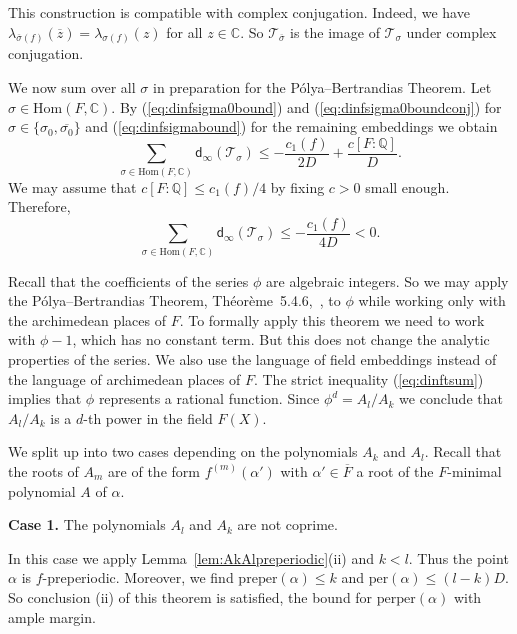 \documentclass[12pt,oneside,a4]{amsart}
\newcommand{\IC}{\mathbb{C}}
\newcommand{\IQ}{\mathbb{Q}}
\newcommand{\cT}{\mathcal{T}}
\numberwithin{maincounter}{section}
\numberwithin{equation}{section}
\begin{document}
This construction is compatible with complex conjugation.
Indeed,
we have $\lambda_{\overline{\sigma}(f)}(\overline z)  =
\lambda_{\sigma(f)}( z)$ for all $z\in\IC$. 
So  $\cT_{\overline\sigma}$ is the image
of $\cT_\sigma$ under complex conjugation.



We now sum over all $\sigma$ in preparation for
the P\'olya--Bertrandias Theorem.
Let $\sigma \in \mathrm{Hom}(F,\IC)$.
By (\ref{eq:dinfsigma0bound}) and (\ref{eq:dinfsigma0boundconj}) for $\sigma\in
\{\sigma_0,\overline{\sigma_0}\}$ and
(\ref{eq:dinfsigmabound}) for the remaining embeddings we obtain
\begin{equation*}
  \sum_{\sigma\in \mathrm{Hom}(F,\IC)} \mathsf{d}_\infty(\cT_\sigma) \le
  -\frac{c_1(f)}{2D} + \frac{c[F:\IQ]}{D}. 
\end{equation*}
We may assume  that $c[F:\IQ] \le c_1(f)/4$ by fixing $c>0$ small enough. Therefore,
\begin{equation}
  \label{eq:dinftsum}
  \sum_{\sigma\in \mathrm{Hom}(F,\IC)} \mathsf{d}_\infty(\cT_\sigma) \le
  -\frac{c_1(f)}{4D}<0.
\end{equation}

Recall that the coefficients of the series $\phi$ are algebraic
integers. So we may apply the P\'olya--Bertrandias Theorem,
Th\'eor\`eme~5.4.6,~\cite{Amice}, to $\phi$ while working only with
the archimedean places of $F$.
To formally apply this theorem we need to work with $\phi-1$, which
has no constant term. But this does not change the analytic properties
of the series.
We also use the language of field
embeddings instead of the language of archimedean places of $F$.
The strict inequality (\ref{eq:dinftsum})
implies that $\phi$ represents a rational function. Since $\phi^d =
A_l/A_k$ we conclude that $A_l/A_k$ is a $d$-th power in the field
$F(X)$.

We split up into two cases depending on the polynomials $A_k$ and $A_l$.
Recall that the roots of $A_m$ are of the form $f^{(m)}(\alpha')$ with
$\alpha'\in\overline F$ a root of the $F$-minimal polynomial $A$ of $\alpha$.

\medskip
\noindent\textbf{Case 1.}
The polynomials $A_l$ and $A_k$ are not coprime.

In this case we apply Lemma~\ref{lem:AkAlpreperiodic}(ii) and $k<l$.
Thus 
the point $\alpha$ is
$f$-preperiodic. Moreover, we find $\mathrm{preper}(\alpha)\le
k$ and $\mathrm{per}(\alpha)\le (l-k)D$. 
So  conclusion (ii) of this theorem  is satisfied, the bound for
$\mathrm{perper}(\alpha)$ with ample margin. 
\end{document}
